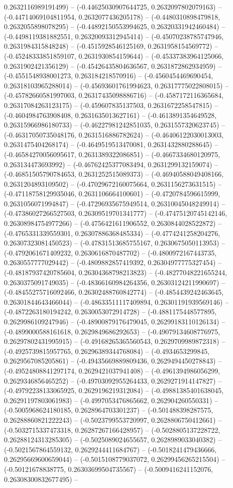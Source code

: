 0.2632116989191499) -- (-0.44625030907644725, 0.2632097802079163) -- (-0.44714069104811954, 0.2632077436205178) -- (-0.4480310898479818, 0.2632055898078295) -- (-0.44892150553994625, 0.26320331942460484) -- (-0.4498119381882551, 0.26320093312945414) -- (-0.45070238785747946, 0.2631984315848248) -- (-0.4515928546125169, 0.2631958154569772) -- (-0.45248333851859107, 0.2631930854159644) -- (-0.45337383964125066, 0.2631902421356129) -- (-0.45426435804636567, 0.2631872862934959) -- (-0.4551548938001273, 0.263184218570916) -- (-0.4560454469690454, 0.26318103965288014) -- (-0.45693601761994623, 0.26317775022808015) -- (-0.45782660581997003, 0.26317435098886716) -- (-0.4587172116365684, 0.26317084263123175) -- (-0.459607835137503, 0.2631672258547815) -- (-0.4604984763908408, 0.2631635013627161) -- (-0.4613891354649528, 0.26315966986180733) -- (-0.46227981242851035, 0.2631557320623745) -- (-0.46317050735048176, 0.2631516886782624) -- (-0.46406122030013003, 0.2631475404268174) -- (-0.4649519513470081, 0.2631432880288645) -- (-0.46584270056095617, 0.2631389322086851) -- (-0.4667334680120975, 0.263134473693992) -- (-0.46762425377083494, 0.2631299132159074) -- (-0.46851505790784653, 0.2631252515089373) -- (-0.46940588049408166, 0.2631204893109502) -- (-0.47029672160075664, 0.2631156273631515) -- (-0.47118758129935046, 0.2631106664100601) -- (-0.4720784596615999, 0.2631056071994847) -- (-0.47296935675949514, 0.26310045048249914) -- (-0.47386027266527503, 0.26309519701341777) -- (-0.47475120745142146, 0.26308984754977266) -- (-0.4756421611906552, 0.2630844028522872) -- (-0.4765331339559301, 0.26307886368485334) -- (-0.4774241258204276, 0.26307323081450523) -- (-0.47831513685755167, 0.2630675050113953) -- (-0.4792061671409232, 0.2630616870487702) -- (-0.4800972167443735, 0.2630557777029442) -- (-0.4809882857419392, 0.26304977775327454) -- (-0.48187937420785604, 0.26304368798213823) -- (-0.48277048221655244, 0.2630375091749035) -- (-0.48366160984264356, 0.26303124211990697) -- (-0.48455275716092466, 0.26302488760842774) -- (-0.4854439242463645, 0.26301844643466044) -- (-0.48633511117409894, 0.26301191939569146) -- (-0.4872263180194242, 0.2630053072914728) -- (-0.4881175448577895, 0.2629986109247946) -- (-0.48900879176479045, 0.26299183110126134) -- (-0.4899000588161618, 0.2629849686292653) -- (-0.49079134608776975, 0.26297802431995915) -- (-0.49168265365560543, 0.2629709989872318) -- (-0.4925739815957765, 0.26296389344768084) -- (-0.4934653299845, 0.2629567085205861) -- (-0.49435669889809436, 0.2629494450278843) -- (-0.49524808841297174, 0.2629421037941408) -- (-0.4961394986056299, 0.2629346856465252) -- (-0.49703092955264433, 0.2629271914147827) -- (-0.49792238133065925, 0.2629196219312084) -- (-0.49881385401638045, 0.26291197803061983) -- (-0.4997053476865662, 0.262904260550331) -- (-0.5005968624180185, 0.2628964703301237) -- (-0.501488398287575, 0.26288860821222243) -- (-0.5023799553720997, 0.2628806750412661) -- (-0.5032715337473318, 0.26287267166428957) -- (-0.5028805137228722, 0.26288124313285305) -- (-0.5025089024655657, 0.2628989033040382) -- (-0.5021567864559132, 0.2629244411684767) -- (-0.5018241479436666, 0.26295669600659044) -- (-0.5015108779037072, 0.26299456265215504) -- (-0.50121678838775, 0.26303699504735567) -- (-0.5009416241152076, 0.26308300832677495) -- 